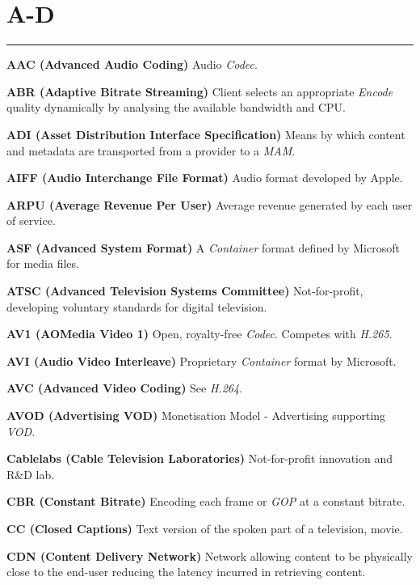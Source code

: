 
\section{A-D}
\hrule

\medskip
\textbf{AAC (Advanced Audio Coding)}
Audio \textit{Codec}.

\smallskip
\textbf{ABR (Adaptive Bitrate Streaming)}
Client selects an appropriate \textit{Encode} quality dynamically by analysing the available bandwidth and CPU.

\smallskip
\textbf{ADI (Asset Distribution Interface Specification)}
Means by which content and metadata are transported from a provider to a \textit{MAM}.

\smallskip
\textbf{AIFF (Audio Interchange File Format)}
Audio format developed by Apple.

\smallskip
\textbf{ARPU (Average Revenue Per User)}
Average revenue generated by each user of service.

\smallskip
\textbf{ASF (Advanced System Format)}
A \textit{Container} format defined by Microsoft for media files.

\smallskip
\textbf{ATSC (Advanced Television Systems Committee)}
Not-for-profit, developing voluntary standards for digital television.

\smallskip
\textbf{AV1 (AOMedia Video 1)}
Open, royalty-free \textit{Codec}. Competes with \textit{H.265}.

\smallskip
\textbf{AVI (Audio Video Interleave)}
Proprietary \textit{Container} format by Microsoft.

\smallskip
\textbf{AVC (Advanced Video Coding)}
See \textit{H.264}.

\smallskip
\textbf{AVOD (Advertising VOD)}
Monetisation Model - Advertising supporting \textit{VOD}.

\smallskip
\textbf{Cablelabs (Cable Television Laboratories)}
Not-for-profit innovation and R\&D lab.

\smallskip
\textbf{CBR (Constant Bitrate)}
Encoding each frame or \textit{GOP} at a constant bitrate.

\smallskip
\textbf{CC (Closed Captions)}
Text version of the spoken part of a television, movie.

\smallskip
\textbf{CDN (Content Delivery Network)}
Network allowing content to be physically close to the end-user reducing the latency incurred in retrieving content.

